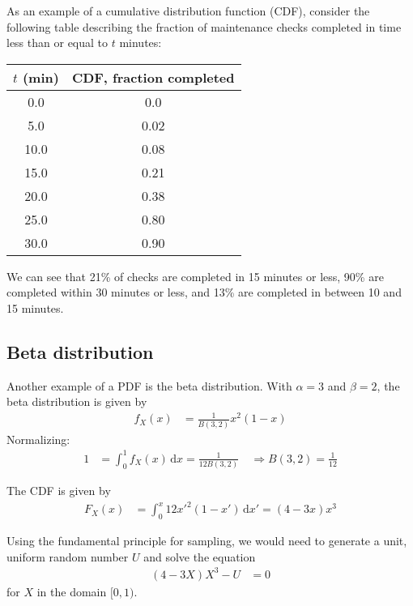 \documentclass[twocolumn]{myarticle}
\renewcommand{\d}{\mathrm{d}}
\begin{document}
As an example of a cumulative distribution function (CDF), consider the following table describing the fraction of maintenance checks completed in time less than or equal to $ t $ minutes:

\bigskip
\begin{center}
    \begin{tabular}{cc}
        \toprule
        $ t $ (min) & CDF, fraction completed \\
        \midrule
        0.0  & 0.0  \\
        5.0  & 0.02 \\
        10.0 & 0.08 \\
        15.0 & 0.21 \\
        20.0 & 0.38 \\
        25.0 & 0.80 \\
        30.0 & 0.90 \\
        \bottomrule
    \end{tabular}
\end{center}
\bigskip

We can see that 21\% of checks are completed in 15 minutes or less, 90\% are completed within 30 minutes or less, and 13\% are completed in between 10 and 15 minutes.

\subsection{Beta distribution}
\label{subsec:beta_distribution}

Another example of a PDF is the beta distribution.
With $ \alpha = 3 $ and $ \beta = 2 $, the beta distribution is given by
\begin{align}
    f_X(x) &= \frac{1}{B(3,2)} x^{2} (1-x)
\end{align}
Normalizing:
\begin{align}
    1 &= \int_{0}^{1} f_X(x) \, \d x = \frac{1}{12 B(3,2)} \quad \Longrightarrow B(3,2) = \frac{1}{12}
\end{align}

The CDF is given by
\begin{align}
    F_X(x) &= \int_{0}^{x} 12 x'^2 (1-x') \, \d x' = \left(4 - 3 x \right) x^3
\end{align}

Using the fundamental principle for sampling, we would need to generate a unit, uniform random number $ U $ and solve the equation
\begin{align}
    \left( 4 - 3X \right) X^3  - U &= 0
\end{align}
for $ X $ in the domain $ [0, 1) $.
\end{document}
